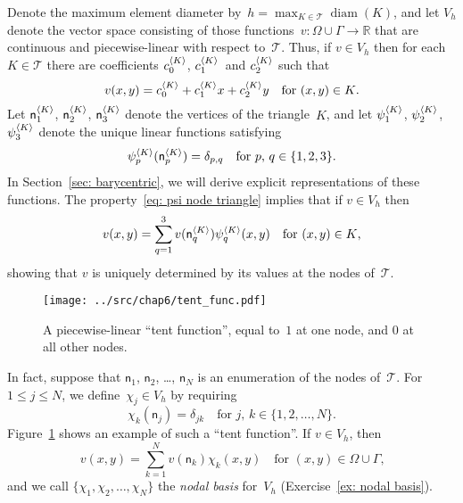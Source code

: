 Denote the maximum element diameter 
by~$h=\max_{K\in\mathcal{T}}\operatorname{diam}(K)$, and let $V_h$ denote the 
vector space consisting of those functions~$v:\Omega\cup\Gamma\to\mathbb{R}$ 
that are continuous and piecewise-linear with respect to~$\mathcal{T}$.  Thus,
if $v\in V_h$ then for each~$K\in\mathcal{T}$ there are coefficients 
$c^{\langle K\rangle}_0$, $c^{\langle K\rangle}_1$~and $c^{\langle K\rangle}_2$ such that
\begin{equation}\label{eq: v K 1 x y}
v(x,y)=c^{\langle K\rangle}_0+c^{\langle K\rangle}_1x+c^{\langle K\rangle}_2y
	\quad\text{for $(x,y)\in K$.}
\end{equation}
Let $\mathsf{n}^{\langle K\rangle}_1$, $\mathsf{n}^{\langle K\rangle}_2$, $\mathsf{n}^{\langle K\rangle}_3$ 
denote the vertices of the triangle~$K$, and let $\psi^{\langle K\rangle}_1$, 
$\psi^{\langle K\rangle}_2$, $\psi^{\langle K\rangle}_3$ denote the unique linear functions 
satisfying
\begin{equation}\label{eq: psi node triangle}
\psi^{\langle K\rangle}_p(\mathsf{n}^{\langle K\rangle}_p)=\delta_{p,q}
	\quad\text{for $p$, $q\in\{1,2,3\}$.}
\end{equation}
In Section~\ref{sec: barycentric}, we will derive explicit representations of 
these functions.  The property~\eqref{eq: psi node triangle} implies that if 
$v\in V_h$ then
\[
v(x,y)=\sum_{q=1}^3v(\mathsf{n}^{\langle K\rangle}_q)\psi^{\langle K\rangle}_q(x,y)
	\quad\text{for $(x,y)\in K$,}
\]
showing that $v$ is uniquely determined by its values at the nodes 
of~$\mathcal{T}$.

\begin{figure}
\caption{A piecewise-linear ``tent function'', equal to~$1$ at one node, and 
$0$ at all other nodes.}\label{fig: tent func}
\begin{center}
\texttt{[image: ../src/chap6/tent\_func.pdf]}
\end{center}
\end{figure}

In fact, suppose that $\mathsf{n}_1$, $\mathsf{n}_2$, \dots, $\mathsf{n}_N$ is 
an enumeration of the nodes of~$\mathcal{T}$.  For~$1\le j\le N$, we 
define~$\chi_j\in V_h$ by requiring
\begin{equation}\label{eq: chi 2d}
\chi_k(\mathsf{n}_j)=\delta_{jk}\quad\text{for $j$, $k\in\{1, 2, \dots, N\}$.}
\end{equation}
Figure~\ref{fig: tent func} shows an example of such a ``tent function''.  
If $v\in V_h$, then
\[
v(x,y)=\sum_{k=1}^N v(\mathsf{n}_k)\chi_k(x,y)
	\quad\text{for $(x,y)\in\Omega\cup\Gamma$,}
\]
and we call $\{\chi_1,\chi_2,\ldots,\chi_N\}$ the \emph{nodal basis} for~$V_h$
(Exercise~\ref{ex: nodal basis}).

